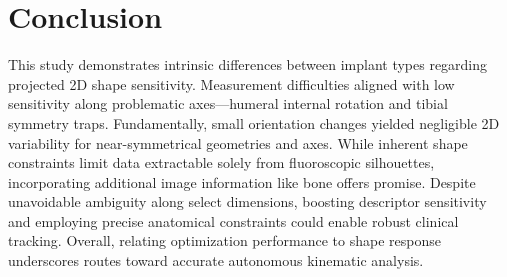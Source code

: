 \section{Conclusion}
This study demonstrates intrinsic differences between implant types regarding projected 2D shape sensitivity.
Measurement difficulties aligned with low sensitivity along problematic axes—humeral internal rotation and tibial symmetry traps.
Fundamentally, small orientation changes yielded negligible 2D variability for near-symmetrical geometries and axes.
While inherent shape constraints limit data extractable solely from fluoroscopic silhouettes, incorporating additional image information like bone offers promise.
Despite unavoidable ambiguity along select dimensions, boosting descriptor sensitivity and employing precise anatomical constraints could enable robust clinical tracking.
Overall, relating optimization performance to shape response underscores routes toward accurate autonomous kinematic analysis.

